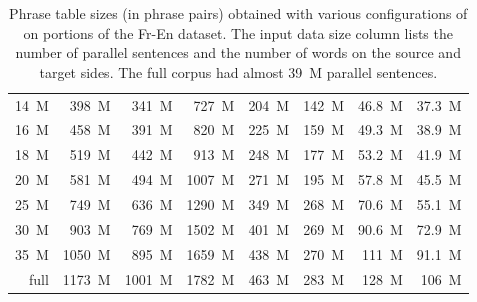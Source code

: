 \begin{table}[!htb]
\begin{tabular}{ | r  r  r | r  r  r  r  r | }
14~M & 398~M & 341~M & 727~M & 204~M & 142~M & 46.8~M & 37.3~M \\
16~M & 458~M & 391~M & 820~M & 225~M & 159~M & 49.3~M & 38.9~M \\
18~M & 519~M & 442~M & 913~M & 248~M & 177~M & 53.2~M & 41.9~M \\
20~M & 581~M & 494~M & 1007~M & 271~M & 195~M & 57.8~M & 45.5~M \\
25~M & 749~M & 636~M & 1290~M & 349~M & 268~M & 70.6~M & 55.1~M \\
30~M & 903~M & 769~M & 1502~M & 401~M & 269~M & 90.6~M & 72.9~M \\
35~M & 1050~M & 895~M & 1659~M & 438~M & 270~M & 111~M & 91.1~M \\
full & 1173~M & 1001~M & 1782~M & 463~M & 283~M & 128~M & 106~M \\
\hline
\end{tabular}
\caption{\label{fr-en-output-size-benchmarking}
Phrase table sizes (in phrase pairs) obtained with various configurations of \eppex{} on portions of the Fr-En dataset.
The input data size column lists the number of parallel sentences and the number of words on the source and target sides.
The full corpus had almost 39~M parallel sentences.}
\end{table}
